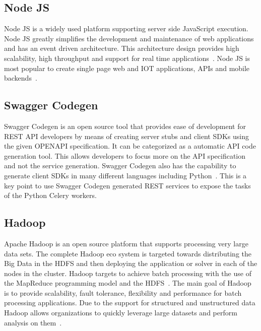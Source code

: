 \subsection{Node JS}

Node JS is a widely used platform supporting server side JavaScript execution. 
Node JS greatly simplifies the development and maintenance of web applications 
and has an event driven architecture. This architecture design 
provides high scalability, high throughput and support for real time 
applications~\cite{hid-sp18-416-www-nodejs-wikipedia}. Node JS is most popular 
to create single page web and IOT applications, APIs and mobile 
backends~\cite{hid-sp18-416-www-nodejs-blog}. 

\subsection{Swagger Codegen}

Swagger Codegen is an open source tool that provides ease of development for 
REST API developers by means of creating server stubs and client SDKs using 
the given OPENAPI specification. It can be categorized as a automatic API code 
generation tool. This allows developers to focus more on the API 
specification and not the service generation. Swagger Codegen also has the 
capability to generate client SDKs in many different languages including 
Python~\cite{hid-sp18-416-www-swagger-codegen}. This is a key point to use 
Swagger Codegen generated REST services to expose the tasks of the Python 
Celery workers. 

\subsection{Hadoop}

Apache Hadoop is an open source platform that supports processing very large 
data sets. The complete Hadoop eco system is targeted towards distributing the 
Big Data in the HDFS and then deploying the application or solver in each of 
the nodes in the cluster. Hadoop targets to achieve batch processing with the 
use of the MapReduce programming model and the 
HDFS~\cite{hid-sp18-416-www-apache-hadoop}. The main goal of Hadoop is to 
provide scalability, fault tolerance, flexibility and performance for batch 
processing applications. Due to the support for structured and unstructured 
data Hadoop allows organizations to quickly leverage large datasets and 
perform analysis on them~\cite{hid-sp18-416-www-hadoop-hortonworks-blog}.

